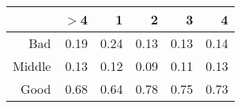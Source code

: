 \begin{table}[ht]
\centering
\begin{tabular}{rrrrrr}
  \hline
 & $>$4 & 1 & 2 & 3 & 4 \\ 
  \hline
Bad & 0.19 & 0.24 & 0.13 & 0.13 & 0.14 \\ 
  Middle & 0.13 & 0.12 & 0.09 & 0.11 & 0.13 \\ 
  Good & 0.68 & 0.64 & 0.78 & 0.75 & 0.73 \\ 
   \hline
\end{tabular}
\end{table}
